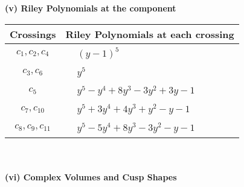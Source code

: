 \documentclass[1p]{elsarticle_modified}
\theoremstyle{definition}
\begin{document}
\newpage\renewcommand{\arraystretch}{1}
\flushleft \textbf{(v) Riley Polynomials at the component}\newline \\
\begin{tabular}{m{50pt}|m{274pt}}
Crossings & \hspace{64pt}Riley Polynomials at each crossing \\
\hline $$\begin{aligned}c_{1},c_{2},c_{4}\end{aligned}$$&$\begin{aligned}
&(y-1)^5
\end{aligned}$\\
\hline $$\begin{aligned}c_{3},c_{6}\end{aligned}$$&$\begin{aligned}
&y^5
\end{aligned}$\\
\hline $$\begin{aligned}c_{5}\end{aligned}$$&$\begin{aligned}
&y^5- y^4+8 y^3-3 y^2+3 y-1
\end{aligned}$\\
\hline $$\begin{aligned}c_{7},c_{10}\end{aligned}$$&$\begin{aligned}
&y^5+3 y^4+4 y^3+y^2- y-1
\end{aligned}$\\
\hline $$\begin{aligned}c_{8},c_{9},c_{11}\end{aligned}$$&$\begin{aligned}
&y^5-5 y^4+8 y^3-3 y^2- y-1
\end{aligned}$\\
\hline
\end{tabular}\\~\\
\newpage\flushleft \textbf{(vi) Complex Volumes and Cusp Shapes}
\end{document}
